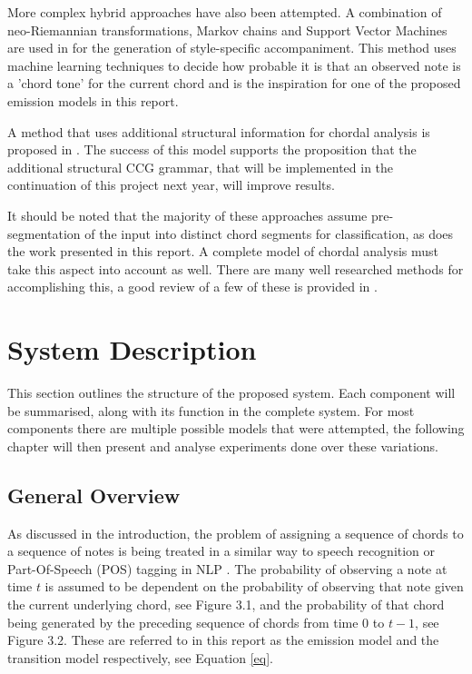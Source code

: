 \documentclass[bsc,singlespacing,parskip,deptreport,twoside,frontabs]{infthesis}
\begin{document}
More complex hybrid approaches have also been attempted. A combination of neo-Riemannian transformations, Markov chains and Support Vector Machines are used in \cite{chuan2007hybrid} for the generation of style-specific accompaniment. This method uses machine learning techniques to decide how probable it is that an observed note is a 'chord tone' for the current chord and is the inspiration for one of the proposed emission models in this report.  

A method that uses additional structural information for chordal analysis is proposed in \cite{struct}. The success of this model supports the proposition that the additional structural CCG grammar, that will be implemented in the continuation of this project next year, will improve results.

It should be noted that the majority of these approaches assume pre-segmentation of the input into distinct chord segments for classification, as does the work presented in this report. A complete model of chordal analysis must take this aspect into account as well. There are many well researched methods for accomplishing this, a good review of a few of these is provided in \cite{pardo2002algorithms}.

\chapter{System Description}

This section outlines the structure of the proposed system. Each component will be summarised, along with its function in the complete system. For most components there are multiple possible models that were attempted, the following chapter will then present and analyse experiments done over these variations.

\section{General Overview}

As discussed in the introduction, the problem of assigning a sequence of chords to a sequence of notes is being treated in a similar way to speech recognition or Part-Of-Speech (POS) tagging in NLP \cite[]{cutting1992practical}. The probability of observing a note at time $t$ is assumed to be dependent on the probability of observing that note given the current underlying chord, see Figure 3.1, and the probability of that chord being generated by the preceding sequence of chords from time 0 to $t-1$, see Figure 3.2. These are referred to in this report as the emission model and the transition model respectively, see Equation \ref{eq}.
\end{document}
